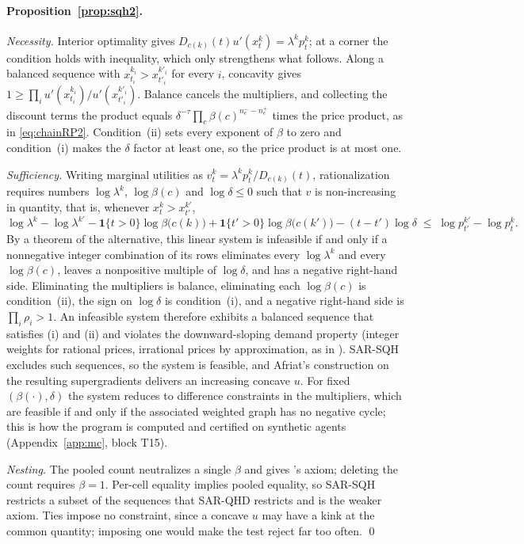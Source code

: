 \documentclass[11pt,a4paper]{article}
\theoremstyle{plain}
\theoremstyle{definition}
\begin{document}
\paragraph{Proposition~\ref{prop:sqh2}.} \emph{Necessity.} Interior optimality gives
$D_{c(k)}(t)u'(x^{k}_{t})=\lambda^{k}p^{k}_{t}$; at a corner the condition holds with inequality, which only
strengthens what follows. Along a balanced sequence with $x^{k_i}_{t_i}>x^{k'_i}_{t'_i}$ for every $i$, concavity
gives $1\ge\prod_i u'(x^{k_i}_{t_i})/u'(x^{k'_i}_{t'_i})$. Balance cancels the multipliers, and collecting the
discount terms the product equals $\delta^{-\tau}\prod_c\beta(c)^{n^-_c-n^+_c}$ times the price product, as in
\eqref{eq:chainRP2}. Condition~(ii) sets every exponent of $\beta$ to zero and condition~(i) makes the $\delta$ factor
at least one, so the price product is at most one.

\emph{Sufficiency.} Writing marginal utilities as $v^{k}_{t}=\lambda^{k}p^{k}_{t}/D_{c(k)}(t)$, rationalization
requires numbers $\log\lambda^{k}$, $\log\beta(c)$ and $\log\delta\le0$ such that $v$ is non-increasing in quantity,
that is, whenever $x^{k}_{t}>x^{k'}_{t'}$,
\[
\log\lambda^{k}-\log\lambda^{k'}
-\mathbf 1\{t>0\}\log\beta\big(c(k)\big)+\mathbf 1\{t'>0\}\log\beta\big(c(k')\big)
-(t-t')\log\delta
\;\le\;\log p^{k'}_{t'}-\log p^{k}_{t}.
\]
By a theorem of the alternative, this linear system is infeasible if and only if a nonnegative integer combination
of its rows eliminates every $\log\lambda^{k}$ and every $\log\beta(c)$, leaves a nonpositive multiple of
$\log\delta$, and has a negative right-hand side. Eliminating the multipliers is balance, eliminating each
$\log\beta(c)$ is condition~(ii), the sign on $\log\delta$ is condition~(i), and a negative right-hand side is
$\prod_i\rho_i>1$. An infeasible system therefore exhibits a balanced sequence that satisfies (i) and (ii) and
violates the downward-sloping demand property (integer weights for rational prices, irrational prices by
approximation, as in \citet{eis2020}). SAR-SQH excludes such sequences, so the system is feasible, and Afriat's
construction on the resulting supergradients delivers an increasing concave $u$. For fixed $(\beta(\cdot),\delta)$
the system reduces to difference constraints in the multipliers, which are feasible if and only if the associated
weighted graph has no negative cycle; this is how the program is computed and certified on synthetic agents
(Appendix~\ref{app:mc}, block T15).

\emph{Nesting.} The pooled count neutralizes a single $\beta$ and gives \citet[Theorem~2]{eis2020}'s axiom; deleting
the count requires $\beta=1$. Per-cell equality implies pooled equality, so SAR-SQH restricts a subset of the
sequences that SAR-QHD restricts and is the weaker axiom. Ties impose no constraint, since a concave $u$ may have a
kink at the common quantity; imposing one would make the test reject far too often. \qed
\end{document}
